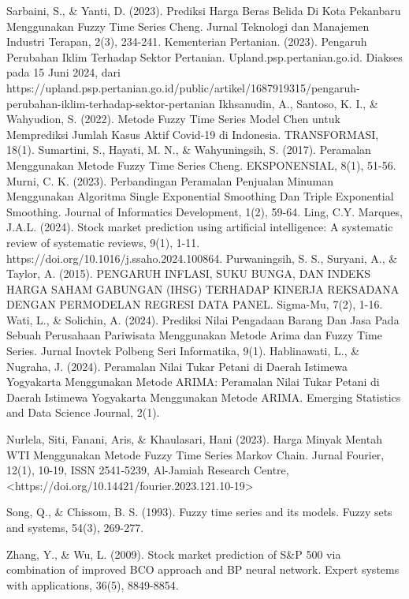\documentclass[conference]{IEEEtran}
\begin{document}
\begin{thebibliography}{00}
 Sarbaini, S., \& Yanti, D. (2023). Prediksi Harga Beras Belida Di Kota Pekanbaru Menggunakan Fuzzy Time Series Cheng. Jurnal Teknologi dan Manajemen Industri Terapan, 2(3), 234-241.
Kementerian Pertanian. (2023). Pengaruh Perubahan Iklim Terhadap Sektor Pertanian. Upland.psp.pertanian.go.id. Diakses pada 15 Juni 2024, dari https://upland.psp.pertanian.go.id/public/artikel/1687919315/pengaruh-perubahan-iklim-terhadap-sektor-pertanian
 Ikhsanudin, A., Santoso, K. I., \& Wahyudion, S. (2022). Metode Fuzzy Time Series Model Chen untuk Memprediksi Jumlah Kasus Aktif Covid-19 di Indonesia. TRANSFORMASI, 18(1).
 Sumartini, S., Hayati, M. N., \& Wahyuningsih, S. (2017). Peramalan Menggunakan Metode Fuzzy Time Series Cheng. EKSPONENSIAL, 8(1), 51-56.
 Murni, C. K. (2023). Perbandingan Peramalan Penjualan Minuman Menggunakan Algoritma Single Exponential Smoothing Dan Triple Exponential Smoothing. Journal of Informatics Development, 1(2), 59-64.
 Ling, C.Y. Marques, J.A.L. (2024). Stock market prediction using artificial intelligence: A systematic review of systematic reviews, 9(1), 1-11. https://doi.org/10.1016/j.ssaho.2024.100864.
 Purwaningsih, S. S., Suryani, A., \& Taylor, A. (2015). PENGARUH INFLASI, SUKU BUNGA, DAN INDEKS HARGA SAHAM GABUNGAN (IHSG) TERHADAP KINERJA REKSADANA DENGAN PERMODELAN REGRESI DATA PANEL. Sigma-Mu, 7(2), 1-16.
 Wati, L., \& Solichin, A. (2024). Prediksi Nilai Pengadaan Barang Dan Jasa Pada Sebuah Perusahaan Pariwisata Menggunakan Metode Arima dan Fuzzy Time Series. Jurnal Inovtek Polbeng Seri Informatika, 9(1).
 Hablinawati, L., \& Nugraha, J. (2024). Peramalan Nilai Tukar Petani di Daerah Istimewa Yogyakarta Menggunakan Metode ARIMA: Peramalan Nilai Tukar Petani di Daerah Istimewa Yogyakarta Menggunakan Metode ARIMA. Emerging Statistics and Data Science Journal, 2(1).

 Nurlela, Siti, Fanani, Aris, \& Khaulasari, Hani (2023). Harga Minyak Mentah WTI Menggunakan Metode Fuzzy Time Series Markov Chain. Jurnal Fourier, 12(1), 10-19, ISSN 2541-5239, Al-Jamiah Research Centre, <https://doi.org/10.14421/fourier.2023.121.10-19>

 Song, Q., \& Chissom, B. S. (1993). Fuzzy time series and its models. Fuzzy sets and systems, 54(3), 269-277.

 Zhang, Y., \& Wu, L. (2009). Stock market prediction of S\&P 500 via combination of improved BCO approach and BP neural network. Expert systems with applications, 36(5), 8849-8854.


\end{thebibliography}
\end{document}
